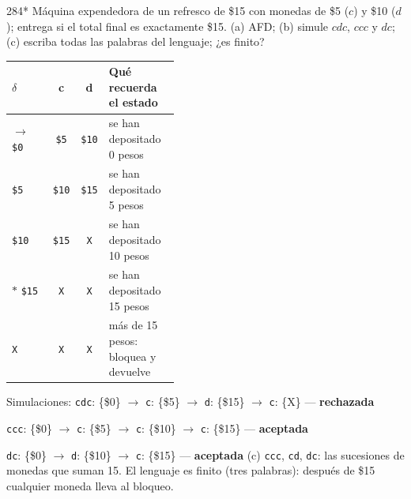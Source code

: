 \documentclass[11pt]{article}
\begin{document}
\begin{ejercicio}{284}{*}
Máquina expendedora de un refresco de \$15 con monedas de \$5 ($c$) y \$10 ($d$); entrega si el total final es exactamente \$15. (a) AFD; (b) simule $cdc$, $ccc$ y $dc$; (c) escriba todas las palabras del lenguaje; ¿es finito?
\end{ejercicio}
\proc \begin{center}\small\begin{tabular}{lccp{0.42\linewidth}}\toprule
$\delta$ & c & d & Qué recuerda el estado \\\midrule
$\to$ \texttt{\$0} & \texttt{\$5} & \texttt{\$10} & se han depositado 0 pesos \\
 \texttt{\$5} & \texttt{\$10} & \texttt{\$15} & se han depositado 5 pesos \\
 \texttt{\$10} & \texttt{\$15} & \texttt{X} & se han depositado 10 pesos \\
$*$ \texttt{\$15} & \texttt{X} & \texttt{X} & se han depositado 15 pesos \\
 \texttt{X} & \texttt{X} & \texttt{X} & más de 15 pesos: bloquea y devuelve \\
\bottomrule\end{tabular}\end{center}
Simulaciones: \texttt{cdc}: \{\$0\} $\to$ \texttt{c}: \{\$5\} $\to$ \texttt{d}: \{\$15\} $\to$ \texttt{c}: \{X\} — \textbf{rechazada}\par \texttt{ccc}: \{\$0\} $\to$ \texttt{c}: \{\$5\} $\to$ \texttt{c}: \{\$10\} $\to$ \texttt{c}: \{\$15\} — \textbf{aceptada}\par \texttt{dc}: \{\$0\} $\to$ \texttt{d}: \{\$10\} $\to$ \texttt{c}: \{\$15\} — \textbf{aceptada}
\resp (c) \texttt{ccc}, \texttt{cd}, \texttt{dc}: las sucesiones de monedas que suman 15. El lenguaje es finito (tres palabras): después de \$15 cualquier moneda lleva al bloqueo.
\end{document}
